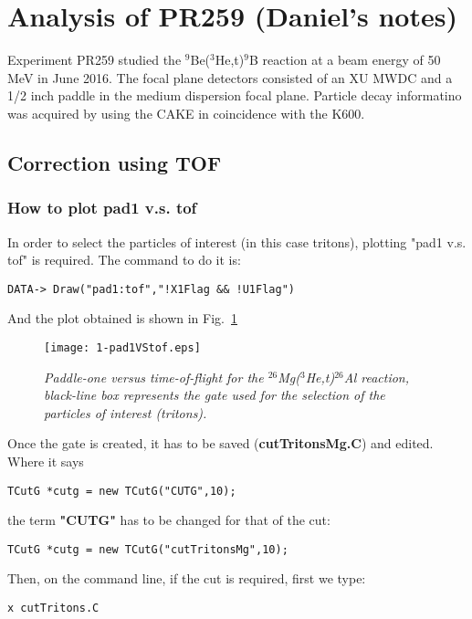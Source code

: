\documentclass[11pt]{report}
\begin{document}
\newpage



\section{Analysis of PR259 (Daniel's notes)}\label{sec:analysisPR259}

Experiment PR259 studied the $^{9}$Be($^{3}$He,t)$^{9}$B reaction at a beam 
energy of 50 MeV in June 2016. The focal plane detectors consisted of an XU MWDC and
a 1/2 inch paddle in the medium dispersion focal plane. Particle decay informatino was
acquired by using the CAKE in coincidence with the K600.

\subsection{Correction using TOF}

\subsubsection{How to plot pad1 v.s. tof}


In order to select the particles of interest (in this case tritons), 
plotting "pad1 v.s. tof" is required.
The command to do it is:
\begin{verbatim}
DATA-> Draw("pad1:tof","!X1Flag && !U1Flag")
\end{verbatim}

\noindent
And the plot obtained is shown in Fig.~\ref{fig:pad1vstof}

\begin{figure}[h]
 \begin{center}
\texttt{[image: 1-pad1VStof.eps]}  
 \end{center}
\vspace*{-4mm} 
\caption{\label{fig:pad1vstof} \it Paddle-one versus time-of-flight for the $^{26}$Mg($^{3}$He,t)$^{26}$Al reaction, black-line box represents the 
gate used for the selection of the particles of interest (tritons).}
\end{figure}
\vspace*{4mm}

\noindent Once the gate is created, it has to be saved (\textbf{cutTritonsMg.C}) and edited. 
Where it says 
\begin{verbatim}
TCutG *cutg = new TCutG("CUTG",10); 
\end{verbatim}
the term \textbf{"CUTG"}
has to be changed for that of the cut:
\begin{verbatim}
TCutG *cutg = new TCutG("cutTritonsMg",10);
\end{verbatim}
\noindent Then, on the command line, if the cut is required, first we type:
\begin{verbatim}
x cutTritons.C
\end{verbatim}
\end{document}
